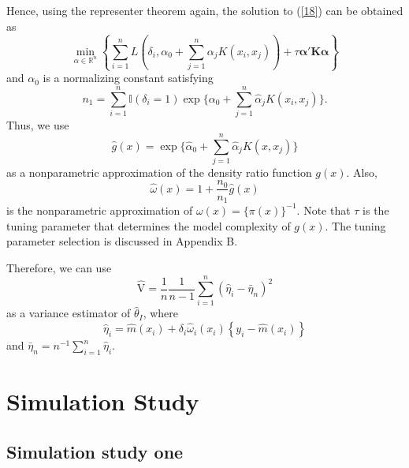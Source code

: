 \documentclass[12pt]{article}
\newcommand{\bx}{{x}}
\newcommand{\balpha}{\boldsymbol{\alpha}}
\def\wh{\widehat}
\newcommand{\hf}[1]{\textcolor{blue}{\textbf{[Hengfang: #1]}}}
\newcommand{\jk}[1]{\textcolor{red}{\textbf{[JK: #1]}}}
\begin{document}
Hence, using the representer theorem again, the solution to (\ref{18}) can be obtained as 
\begin{equation} \label{entropy_method}
\min_{ \alpha \in \mathbb{R}^n  } \left\{ \sum_{i=1}^n L( \delta_i, \alpha_0 + \sum_{j=1}^n   \alpha_j K( x_i, x_j )) + \tau \balpha' \mathbf{K}  \balpha  \right\} 
\end{equation}
and $\alpha_0$ is a normalizing constant satisfying 
$$ n_1 = \sum_{i=1}^n  \mathbb{I} (\delta_i = 1) \exp \{ \alpha_0 + \sum_{j=1}^n  \hat{\alpha}_j K( x_i, x_j ) \} . $$
 Thus, we use 
\begin{equation}
 \hat{g} (x) = \exp \{ \hat{\alpha}_0 + \sum_{j=1}^n  \hat{\alpha}_j K( x, x_j)  \}
 \label{final} 
 \end{equation} 
 as a nonparametric approximation of the density ratio function $g( x)$. Also, 
 \begin{equation} 
 \hat{\omega} (x)= 1+ \frac{n_0}{n_1} \hat{g} (x)
 \label{final2}
 \end{equation} 
 is the nonparametric approximation of $\omega(x) = \{ \pi(x) \}^{-1}$. Note that $\tau$ is the tuning parameter that determines the model complexity of $g(x)$. The tuning parameter selection is discussed in Appendix B.  
 
 
 
 
Therefore, we can use 
\begin{equation} 
\wh{\mbox{V}}  = \frac{1}{n} \frac{1}{n-1} \sum_{i=1}^n \left( \hat{\eta}_i - \bar{\eta}_n \right)^2  
\label{varh}
\end{equation} 
as a variance estimator of $\hat{\theta}_I$, where 
\begin{equation} 
\hat{\eta}_i = \wh{m}(\bx_{i}) + \delta_{i} \wh{\omega}_{i} (x_i) \left\{ y_{i} - \wh{m}(\bx_{i})\right\}
\end{equation} 
and $\bar{\eta}_n = n^{-1} \sum_{i=1}^n \hat{\eta}_i$. 






\section{Simulation Study}


\subsection{Simulation study one} 
\end{document}
